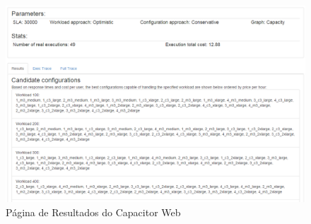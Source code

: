 \begin{figure}[htb]
  \caption{\label{fig:capacitor_web_results}Página de Resultados do Capacitor Web}
  \begin{center}
    \includegraphics[scale=0.5]{img/CapacitorWeb_Results}
  \end{center}
\end{figure}

